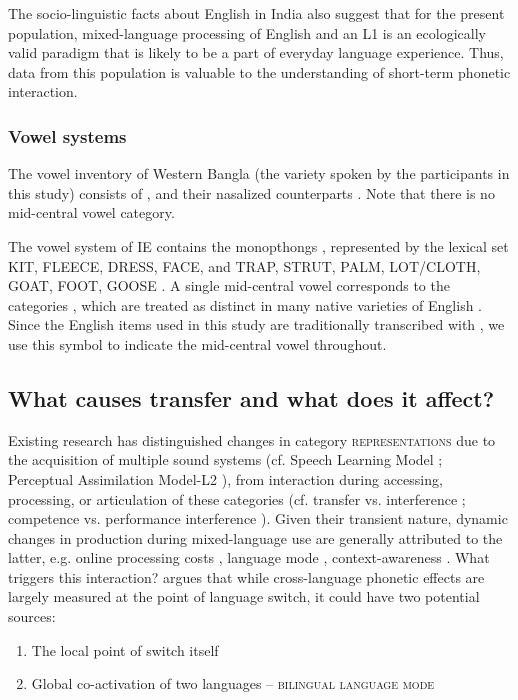 \documentclass[12 pt]{article}
\newcommand{\nt}[1]{\textipa{[#1]}} %
\begin{document}
The socio-linguistic facts about English in India also suggest that for the present population, mixed-language processing of English and an L1 is an ecologically valid paradigm that is likely to be a part of everyday language experience. Thus, data from this population is valuable to the understanding of short-term phonetic interaction.

\subsubsection*{Vowel systems} \label{vowel systems}
The vowel inventory of Western Bangla (the variety spoken by the participants in this study) consists of \nt{i, e, \ae, a, O, o, u}, and their nasalized counterparts \citep{garry2001facts}. Note that there is no mid-central vowel category. 


The vowel system of IE contains the monopthongs \nt{I, i, E, e, \ae, @/2, a:, O, o, U, u}, represented by the lexical set KIT, FLEECE, DRESS, FACE, and TRAP, STRUT, PALM, LOT/CLOTH, GOAT, FOOT, GOOSE \citep{wells1982accents, masica1972sound}. %
A single mid-central vowel corresponds to the categories \nt{2,@,3:}, which are treated as distinct in many native varieties of English \citep{nihalani1979indian,wells1982accents,hickey2005legacies,bansal1969intelligibility}. Since the English items used in this study are traditionally transcribed with \nt{2}, we use this symbol to indicate the mid-central vowel throughout. 
 

\subsection{What causes transfer and what does it affect?}\label{causes}

Existing research has distinguished changes in category \textsc{representations} due to the acquisition of multiple sound systems (cf. Speech Learning Model \citep{flege1995second,flege2007language}; Perceptual Assimilation Model-L2 \citep{best2007nonnative}), from interaction during accessing, processing, or articulation of these categories (cf. transfer vs. interference \citep{grosjean2012attempt}; competence vs. performance interference \citep{paradis1993linguistic}). 
Given their transient nature, dynamic changes in production during mixed-language use are generally attributed to the latter, e.g. online processing costs \citep{olson2013bilingual,tsui2019impact,vsimavckova2015immediate}, language mode \citep{simonet2014phonetic}, context-awareness \citep{khattab2013phonetic}. What triggers this interaction? \cite{olson2016role} argues that while cross-language phonetic effects are largely measured at the point of language switch, it could have two potential sources:
\begin{enumerate}
	\item The local point of switch itself
	\item Global co-activation of two languages -- \textsc{bilingual language mode} \citep{grosjean1998studying} 
\end{enumerate}
\end{document}
